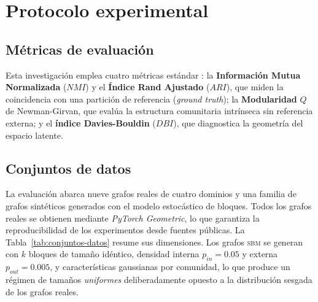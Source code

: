 \documentclass[twoside,twocolumn,10pt]{article}
\begin{document}
\section{Protocolo experimental}
\label{sec:protocolo-experimental}
\fontsize{10}{12}\selectfont

\subsection{Métricas de evaluación}
\label{sec:metricas-evaluacion}

Esta investigación emplea cuatro métricas estándar \cite{Mothe2017}: la \textbf{Información Mutua Normalizada} ($NMI$) y el \textbf{Índice Rand Ajustado} ($ARI$), que miden la coincidencia con una partición de referencia (\textit{ground truth}); la \textbf{Modularidad} $Q$ de Newman-Girvan, que evalúa la estructura comunitaria intrínseca sin referencia externa; y el \textbf{índice Davies-Bouldin} ($DBI$), que diagnostica la geometría del espacio latente.

\subsection{Conjuntos de datos}
\label{subsec:conjuntos-de-datos}

La evaluación abarca nueve grafos reales de cuatro dominios y una familia de grafos sintéticos generados con el modelo estocástico de bloques. Todos los grafos reales se obtienen mediante \textit{PyTorch Geometric}, lo que garantiza la reproducibilidad de los experimentos desde fuentes públicas. La Tabla~\ref{tab:conjuntos-datos} resume sus dimensiones. Los grafos \textsc{sbm} se generan con $k$ bloques de tamaño idéntico, densidad interna $p_{in}=0.05$ y externa $p_{out}=0.005$, y características gaussianas por comunidad, lo que produce un régimen de tamaños \emph{uniformes} deliberadamente opuesto a la distribución sesgada de los grafos reales.
\end{document}
